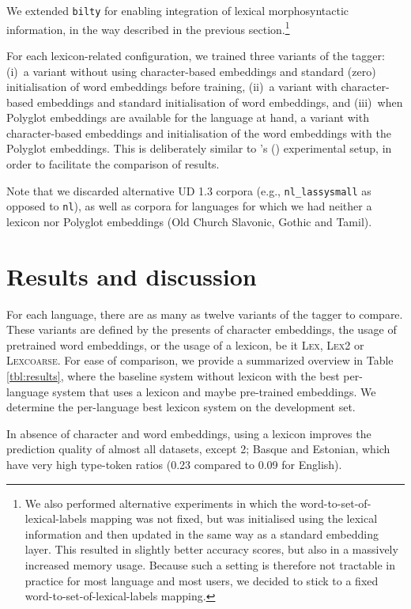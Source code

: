 \documentclass[11pt,letterpaper]{article}
\begin{document}
We extended \texttt{bilty} for enabling integration of lexical morphosyntactic information, in the way described in the
previous section.\footnote{We also performed alternative experiments in which the word-to-set-of-lexical-labels mapping
  was not fixed, but was initialised using the lexical information and then updated in the same way as a standard
  embedding layer. This resulted in slightly better accuracy scores, but also in a massively increased memory
  usage. Because such a setting is therefore not tractable in practice for most language and most users, we decided to
  stick to a fixed word-to-set-of-lexical-labels mapping.}

For each lexicon-related configuration, we trained three variants of the tagger: (i)~a variant without using
character-based embeddings and standard (zero) initialisation of word embeddings before training, (ii)~a variant with
character-based embeddings and standard initialisation of word embeddings, and (iii)~when Polyglot embeddings are
available for the language at hand, a variant with character-based embeddings and initialisation of the word embeddings
with the Polyglot embeddings. This is deliberately similar to \citeauthor{plank16}'s (\citeyear{plank16}) experimental
setup, in order to facilitate the comparison of results.

Note that we discarded alternative UD 1.3 corpora (e.g., {\tt nl\_lassysmall} as opposed to {\tt nl}), as well as
corpora for languages for which we had neither a lexicon nor Polyglot embeddings (Old Church Slavonic, Gothic and Tamil).


\section{Results and discussion}

For each language, there are as many as twelve variants of the tagger to compare. These variants are defined by the presents of character embeddings, the usage of pretrained word embeddings, or the usage of a lexicon, be it \textsc{Lex}, \textsc{Lex2} or \textsc{Lexcoarse}. For ease of comparison, we provide a summarized overview in Table \ref{tbl:results}, where the baseline system without lexicon with the best per-language system that uses a lexicon and maybe pre-trained embeddings. We determine the per-language best lexicon system on the development set.

In absence of character and word embeddings, using a lexicon improves the prediction quality of almost all datasets, except 2; Basque and Estonian, which have very high type-token ratios (0.23 compared to 0.09 for English).
\end{document}
